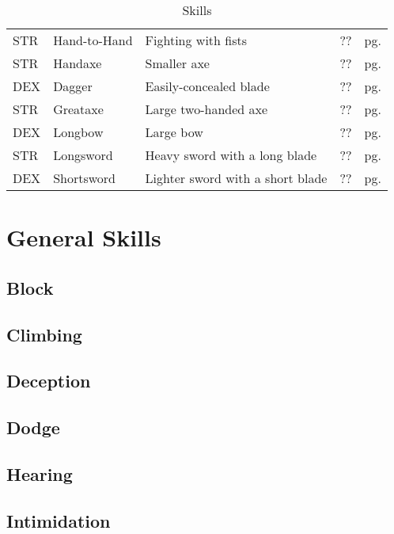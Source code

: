 \begin{table}[h!]
\begin{tabular}{l l l l l}
        STR & Hand-to-Hand & Fighting with fists & ?? & pg. \pageref{skill:hand-to-hand} \\
        STR & Handaxe & Smaller axe & ?? & pg. \pageref{skill:handaxe} \\
        DEX & Dagger & Easily-concealed blade & ?? & pg. \pageref{skill:dagger} \\
        STR & Greataxe & Large two-handed axe & ?? & pg. \pageref{skill:greataxe} \\
        DEX & Longbow & Large bow & ?? & pg. \pageref{skill:longbow} \\
        STR & Longsword & Heavy sword with a long blade & ?? & pg. \pageref{skill:longsword} \\
        DEX & Shortsword & Lighter sword with a short blade & ?? & pg. \pageref{skill:shortsword} \\
    \end{tabular}
    \label{tab:skills}
    \caption{Skills}
\end{table}

\section{General Skills}

\subsection{Block}\label{skill:block}

\subsection{Climbing}\label{skill:climbing}

\subsection{Deception}\label{skill:deception}

\subsection{Dodge}\label{skill:dodge}

\subsection{Hearing}\label{skill:hearing}

\subsection{Intimidation}\label{skill:intimidation}

